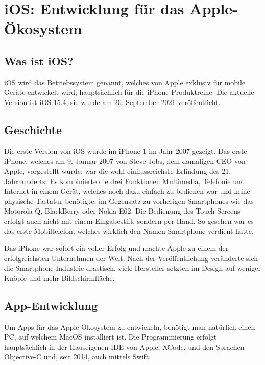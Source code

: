 \section{iOS: Entwicklung für das Apple-Ökosystem}
\label{iosdev}

\subsection{Was ist iOS?}
iOS wird das Betriebssystem genannt, welches von Apple exklusiv für mobile Geräte entwickelt wird,
hauptsächlich für die iPhone-Produktreihe. Die aktuelle Version ist iOS 15.4, sie wurde am 20.
September 2021 veröffentlicht.

\subsection{Geschichte}
Die erste Version von iOS wurde im iPhone 1 im Jahr 2007 gezeigt. Das erste iPhone, welches am 9.
Januar 2007 von Steve Jobs, dem damaligen CEO von Apple, vorgestellt wurde, war die wohl
einflussreichste Erfindung des 21. Jahrhunderts. Es kombinierte die drei Funktionen Multimedia,
Telefonie und Internet in einem Gerät, welches noch dazu einfach zu bedienen war und keine physische
Tastatur benötigte, im Gegensatz zu vorherigen Smartphones wie das Motorola Q, BlackBerry oder Nokia
E62. Die Bedienung des Touch-Screens erfolgt auch nicht mit einem Eingabestift, sondern per Hand. So
gesehen war es das erste Mobiltelefon, welches wirklich den Namen Smartphone verdient hatte.

Das iPhone war sofort ein voller Erfolg und machte Apple zu einem der erfolgreichsten Unternehmen
der Welt. Nach der Veröffentlichung veränderte sich die Smartphone-Industrie drastisch, viele
Hersteller setzten im Design auf weniger Knöpfe und mehr Bildschirmfläche.

\subsection{App-Entwicklung}
Um Apps für das Apple-Ökosystem zu entwickeln, benötigt man natürlich einen PC, auf welchem MacOS
installiert ist. Die Programmierung erfolgt hauptsächlich in der Hauseigenen IDE von Apple, XCode,
und den Sprachen Objective-C und, seit 2014, auch mittels Swift.
